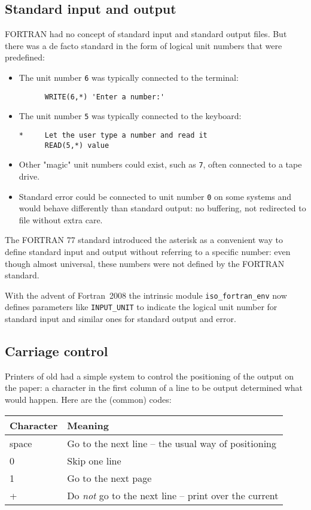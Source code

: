 \subsection{Standard input and output}
FORTRAN had no concept of standard input and standard output files. But there was a de facto
standard in the form of logical unit numbers that were predefined:
\begin{itemize}
\item
The unit number \verb+6+ was typically connected to the terminal:
\begin{verbatim}
      WRITE(6,*) 'Enter a number:'
\end{verbatim}
\item
The unit number \verb+5+ was typically connected to the keyboard:
\begin{verbatim}
*     Let the user type a number and read it
      READ(5,*) value
\end{verbatim}
\item
Other "magic" unit numbers could exist, such as \verb+7+, often connected to a tape drive.
\item
Standard error could be connected to unit number \verb+0+ on some systems and would behave
differently than standard output: no buffering, not redirected to file without extra care.
\end{itemize}

The FORTRAN 77 standard introduced the asterisk as a convenient way to define standard input
and output without referring to a specific number: even though almost universal, these numbers
were not defined by the FORTRAN standard.

With the advent of Fortran~2008 the intrinsic module \verb+iso_fortran_env+ now defines
parameters like \verb+INPUT_UNIT+ to indicate the logical unit number for standard input and
similar ones for standard output and error.


\subsection{Carriage control}
Printers of old had a simple system to control the positioning of the output on the paper:
a character in the first column of a line to be output determined what would happen. Here
are the (common) codes:
\begin{table}[h]
\begin{tabular}{ll}
\hline
Character    & Meaning \\
\hline
space        & Go to the next line -- the usual way of positioning \\
0            & Skip one line \\
1            & Go to the next page \\
+            & Do \emph{not} go to the next line -- print over the current \\
\end{tabular}
\end{table}

